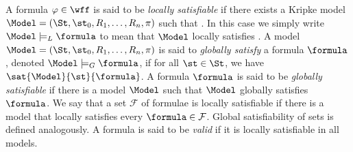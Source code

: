 
A formula $\varphi \in \wff$ is said to be \emph{locally satisfiable} if there
exists a Kripke model $\Model = (\St, \st_0, R_1, \ldots, R_n, \pi)$ such that
. In this case we simply write $\Model \models_L
\formula$ to mean that $\Model$ locally satisfies \formula. A model
$\Model = (\St, \st_0, R_1, \ldots, R_n, \pi)$ is said to \emph{globally satisfy}
a formula $\formula$, denoted $\Model \models_G \formula$, if for all $\st \in
\St$, we have $\sat{\Model}{\st}{\formula}$. A formula $\formula$ is said to be
\emph{globally satisfiable} if there is a model $\Model$ such that $\Model$
globally satisfies $\formula$.  We say that a set $\mathcal{F}$ of formulae is
locally satisfiable if there is a model that locally satisfies every $\formula
\in \mathcal{F}$. Global satisfiability of sets is defined analogously. A
formula is said to be \emph{valid} if it is locally satisfiable in all models.

